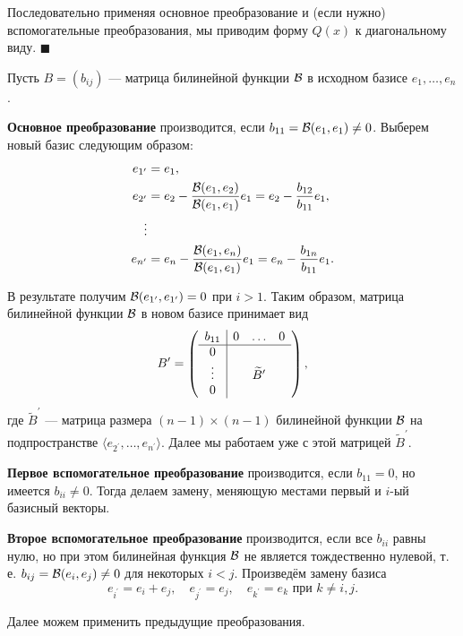 Последовательно применяя основное преобразование и (если нужно) вспомогательные преобразования, мы приводим форму $Q(x)$ к диагональному виду.
\hfill$\blacksquare$\par\smallskip

\smallskip
{}
Пусть $B = (b_{ij})$ --- матрица билинейной функции $\mathcal{B}$ в исходном базисе $e_1, \ldots, e_n$.

\textbf{Основное преобразование} производится, если $b_{11} = \mathcal{B}(e_1, e_1) \ne 0$. Выберем новый базис следующим образом:
\begin{align*}
    e_{1^\prime} &= e_1,\\
    e_{2^\prime} &= e_2 - \frac{\mathcal{B}(e_1, e_2)}{\mathcal{B}(e_1, e_1)}e_1 = e_2 - \frac{b_{12}}{b_{11}}e_1,\\
    \vdots\\
    e_{n^\prime} &= e_n - \frac{\mathcal{B}(e_1, e_n)}{\mathcal{B}(e_1, e_1)}e_1 = e_n - \frac{b_{1n}}{b_{11}}e_1.
\end{align*}

В результате получим $\mathcal{B}(e_{1^\prime}, e_{1^\prime}) = 0$ при $i > 1$. Таким образом, матрица билинейной функции $\mathcal{B}$ в новом базисе принимает вид
\[
    B^\prime =
    \left(
    \begin{array}{c | c c c}
        b_{11} & 0 & \ldots & 0\\
        \hline
        0 & & & \\
        \vdots & & \widetilde{B}^\prime & \\
        0 & & & 
    \end{array}
    \right),
\]
где $\widetilde{B}^\prime$ --- матрица размера $(n - 1) \times (n - 1)$ билинейной функции $\mathcal{B}$ на подпространстве $\langle e_{2^\prime}, \ldots, e_{n^\prime} \rangle$. Далее мы работаем уже с этой матрицей $\widetilde{B}^\prime$.

\textbf{Первое вспомогательное преобразование} производится, если $b_{11} = 0$, но имеется $b_{ii} \ne 0$. Тогда делаем замену, меняющую местами первый и $i$-ый базисный векторы.

\textbf{Второе вспомогательное преобразование} производится, если все $b_{ii}$ равны нулю, но при этом билинейная функция $\mathcal{B}$ не является тождественно нулевой, т.\,е. $b_{ij} = \mathcal{B}(e_i, e_j) \ne 0$ для некоторых $i < j$. Произведём замену базиса
\[
    e_{i^\prime} = e_i + e_j,\quad e_{j^\prime} = e_j,\quad e_{k^\prime} = e_k\text{ при $k \ne i, j$}.
\]

Далее можем применить предыдущие преобразования.


